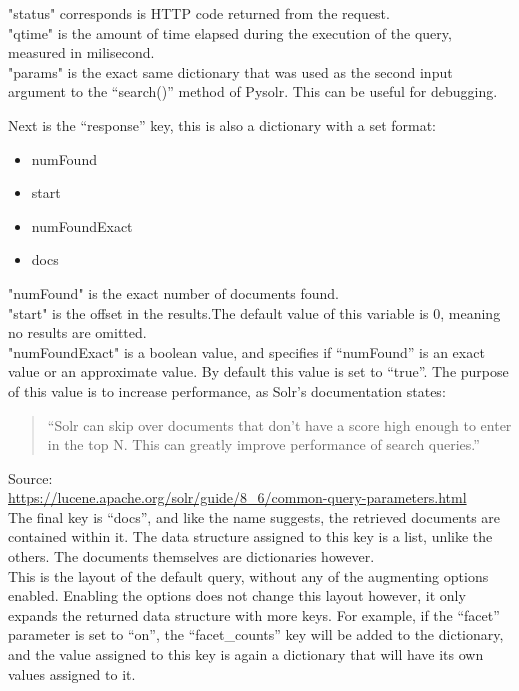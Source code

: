 \documentclass[a4paper,english]{report}
\begin{document}
\noindent "status" corresponds is HTTP code returned from the request.\\ 
"qtime" is the amount of time elapsed during the execution of the query, measured in milisecond.\\
"params" is the exact same dictionary that was used as the second input argument to the “search()” method of Pysolr. This can be useful for debugging.

Next is the “response” key, this is also a dictionary with a set format:

\begin{itemize}

\item  numFound
\item start
\item numFoundExact
\item docs 

\end{itemize}


"numFound" is the exact number of documents found.\\ 
"start" is the offset in the results.The default value of this variable is 0, meaning no results are omitted.\\
"numFoundExact" is a boolean value, and specifies if “numFound” is an exact value or an approximate value. By default this value is set to “true”. The purpose of this value is to increase performance, as Solr’s documentation states:\\

 \begin{quotation}
	“Solr can skip over documents that don’t have a score high enough to enter in the top N. This can greatly improve performance of search queries.” 
 \end{quotation}
Source:\\ \url{https://lucene.apache.org/solr/guide/8_6/common-query-parameters.html}\\

The final key is “docs”, and like the name suggests, the retrieved documents are contained within it. The data structure assigned to this key is a list, unlike the others. The documents themselves are dictionaries however.\\

This is the layout of the default query, without any of the augmenting options enabled.
Enabling the options does not change this layout however, it only expands the returned data structure with more keys. For example, if the “facet” parameter is set to “on”, the “facet\_counts” key will be added to the dictionary, and the value assigned to this key is again a dictionary that will have its own values assigned to it.\\ 
\end{document}
